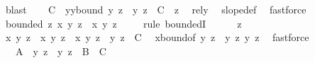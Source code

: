 \begin{isabellebody}
\ blast\isanewline
\isanewline
\ \ \isamarkupfalse%
\ C{\isacharprime}{\kern0pt}\ \ y{\isacharunderscore}{\kern0pt}y{\isacharprime}{\kern0pt}{\isacharunderscore}{\kern0pt}bound{\isacharcolon}{\kern0pt}\ {\isachardoublequoteopen}{\isasymbar}y\ z\ {\isacharminus}{\kern0pt}\ y{\isacharprime}{\kern0pt}\ z{\isasymbar}\ {\isasymle}\ C{\isacharprime}{\kern0pt}{\isachardoublequoteclose}\ \ z\ \isamarkupfalse%
\ rel{\isacharunderscore}{\kern0pt}y{\isacharparenleft}{\kern0pt}{}{\isacharparenright}{\kern0pt}\ \isamarkupfalse%
\ slope{\isacharunderscore}{\kern0pt}def\ \isamarkupfalse%
\ fastforce\isanewline
\isanewline
\ \ \isamarkupfalse%
\ {\isachardoublequoteopen}bounded\ {\isacharparenleft}{\kern0pt}{\isasymlambda}z{\isachardot}{\kern0pt}\ x{\isacharprime}{\kern0pt}\ {\isacharparenleft}{\kern0pt}y\ z{\isacharparenright}{\kern0pt}\ {\isacharminus}{\kern0pt}\ x{\isacharprime}{\kern0pt}\ {\isacharparenleft}{\kern0pt}y{\isacharprime}{\kern0pt}\ z{\isacharparenright}{\kern0pt}{\isacharparenright}{\kern0pt}{\isachardoublequoteclose}\ \isanewline
\ \ \isamarkupfalse%
\ {\isacharparenleft}{\kern0pt}rule\ boundedI{\isacharparenright}{\kern0pt}\isanewline
\ \ \ \ \isamarkupfalse%
\ z\isanewline
\ \ \ \ \isamarkupfalse%
\ {\isachardoublequoteopen}{\isasymbar}x{\isacharprime}{\kern0pt}\ {\isacharparenleft}{\kern0pt}y\ z{\isacharparenright}{\kern0pt}\ {\isacharminus}{\kern0pt}\ x{\isacharprime}{\kern0pt}\ {\isacharparenleft}{\kern0pt}y{\isacharprime}{\kern0pt}\ z{\isacharparenright}{\kern0pt}{\isasymbar}\ {\isasymle}\ {\isasymbar}x{\isacharprime}{\kern0pt}\ {\isacharparenleft}{\kern0pt}y\ z\ {\isacharminus}{\kern0pt}\ y{\isacharprime}{\kern0pt}\ z{\isacharparenright}{\kern0pt}{\isasymbar}\ {\isacharplus}{\kern0pt}\ C{\isachardoublequoteclose}\ \isamarkupfalse%
\ x{\isacharprime}{\kern0pt}{\isacharunderscore}{\kern0pt}bound{\isacharbrackleft}{\kern0pt}of\ {\isachardoublequoteopen}y\ z\ {\isacharminus}{\kern0pt}\ y{\isacharprime}{\kern0pt}\ z{\isachardoublequoteclose}\ {\isachardoublequoteopen}y{\isacharprime}{\kern0pt}\ z{\isachardoublequoteclose}{\isacharbrackright}{\kern0pt}\ \isamarkupfalse%
\ fastforce\isanewline
\ \ \ \ \isamarkupfalse%
\ \isamarkupfalse%
\ {\isachardoublequoteopen}{\isachardot}{\kern0pt}{\isachardot}{\kern0pt}{\isachardot}{\kern0pt}\ {\isasymle}\ A\ {\isacharasterisk}{\kern0pt}\ {\isasymbar}y\ z\ {\isacharminus}{\kern0pt}\ y{\isacharprime}{\kern0pt}\ z{\isasymbar}\ {\isacharplus}{\kern0pt}\ B\ {\isacharplus}{\kern0pt}\ C{\isachardoublequoteclose}\ \isamarkupfalse%

\end{isabellebody}
